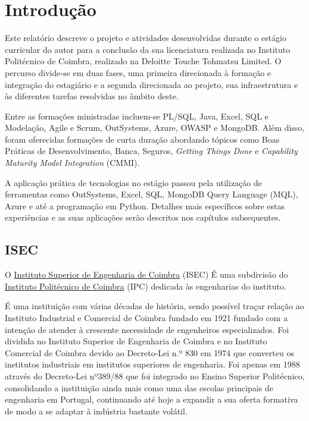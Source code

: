 \section{Introdução}\label{sec:introducao}

    Este relatório descreve o projeto e atividades desenvolvidas durante o estágio curricular do autor para a conclusão da sua licenciatura realizada no Instituto Politécnico de Coimbra, realizado na Deloitte Touche Tohmatsu Limited. O percurso divide-se em duas fases, uma primeira direcionada à formação e integração do estagiário e a segunda direcionada ao projeto, sua infraestrutura e às diferentes tarefas resolvidas no âmbito deste.

    Entre as formações ministradas incluem-se PL/SQL, Java, Excel, SQL e Modelação, Agile e Scrum, OutSystems, Azure, OWASP e MongoDB. Além disso, foram oferecidas formações de curta duração abordando tópicos como Boas Práticas de Desenvolvimento, Banca, Seguros, \textit{Getting Things Done} e \textit{Capability Maturity Model Integration} (CMMI).

    A aplicação prática de tecnologias no estágio passou pela utilização de ferramentas como OutSystems, Excel, SQL, MongoDB Query Language (MQL), Azure e até a programação em Python. Detalhes mais específicos sobre estas experiências e as suas aplicações serão descritos nos capítulos subsequentes.

    \subsection{ISEC}\label{subsec:isec}
    
        O \href{https://isec.pt/}{Instituto Superior de Engenharia de Coimbra} (ISEC) É uma subdivisão do \href{https://ipc.pt/}{Instituto Politécnico de Coimbra} (IPC) dedicada às engenharias do instituto.
    
        É uma instituição com várias décadas de história, sendo possível traçar relação ao Instituto Industrial e Comercial de Coimbra fundado em 1921\cite{iscac} fundado com a intenção de atender à crescente necessidade de engenheiros especializados. Foi dividida no Instituto Superior de Engenharia de Coimbra e no Instituto Comercial de Coimbra devido ao Decreto-Lei n.º 830\cite{iscac} em 1974 que converteu os institutos industriais em institutos superiores de engenharia. Foi apenas em 1988\cite{wiki-isec} através do Decreto-Lei nº389/88\cite{decreto389/88} que foi integrado no Ensino Superior Politécnico, consolidando a instituição ainda mais como uma das escolas principais de engenharia em Portugal, continuando até hoje a expandir a sua oferta formativa de modo a se adaptar à indústria bastante volátil.
    
